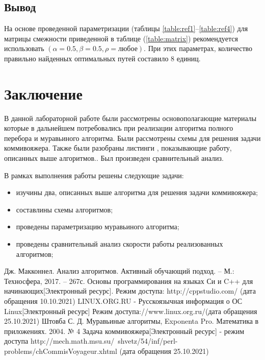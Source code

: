 \documentclass[12pt,a4paper]{report}
\begin{document}
\newpage
\section*{Вывод}

На основе проведенной параметризации (таблицы \ref{table:ref1}--\ref{table:ref4}) для матрицы смежности
приведенной в таблице (\ref{table:matrix}) рекомендуется использовать
$(\alpha = 0.5, \beta = 0.5, \rho = \text{любое})$.
При этих параметрах, количество правильно найденных оптимальных путей составило 8 единиц.







\newpage
\chapter*{Заключение}


В данной лабораторной работе были рассмотрены
основополагающие материалы которые в дальнейшем потребовались
при реализации алгоритма полного перебора и муравьиного алгоритма.
Были рассмотрены схемы 
для решения задачи коммивояжера.
Также были разобраны листинги ,
показывающие работу, описанных выше алгоритмов..
Был произведен сравнительный анализ.


В рамках выполнения работы решены следующие задачи:

\begin{itemize}
	\item изучины два, описанных выше алгоритма для решения задачи коммивояжера;
	\item составлины схемы алгоритмов;
	\item проведены параметризацию муравьиного алгоритма;
	\item проведены сравнительный анализ скорости работы реализованных алгоритмов;
\end{itemize}


	
\newpage
\renewcommand\bibname{Список литературы}
\makeatletter %
\def\@biblabel#1{#1. }
\makeatother
\begin{thebibliography}{2}
	 Дж. Макконнел. Анализ алгоритмов. Активный обучающий подход. -- М.: Техносфера, 2017. -- 267с.
	Основы программирования на языках Си и C++ для начинающих[Электронный ресурс]. Режим доступа: http://cppstudio.com/ (дата обращения 10.10.2021)
	LINUX.ORG.RU - Русскоязычная информация о ОС Linux[Электронный ресурс] Режим доступа://www.linux.org.ru/(дата обращения 25.10.2021)
	 Штовба С. Д. Муравьиные алгоритмы, Exponenta Pro. Математика в приложениях. 2004. № 4
	 Задача коммивояжера[Электронный ресурс] - режим доступа http://mech.math.msu.su/~shvetz/54/inf/perl-problems/chCommisVoyageur.xhtml
	(дата обращения 25.10.2021)
	
\end{thebibliography}
\end{document}

